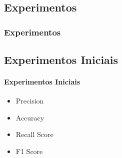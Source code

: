 \documentclass{beamer}
\begin{document}
\begin{frame}
\section{Experimentos} 
\frametitle{Experimentos}
\subsection{Experimentos Iniciais}
\framesubtitle{Experimentos Iniciais}
\begin{itemize}
\item Precision
\item Accuracy
\item Recall Score
\item F1 Score
\end{itemize}
\end{frame}
\end{document}
